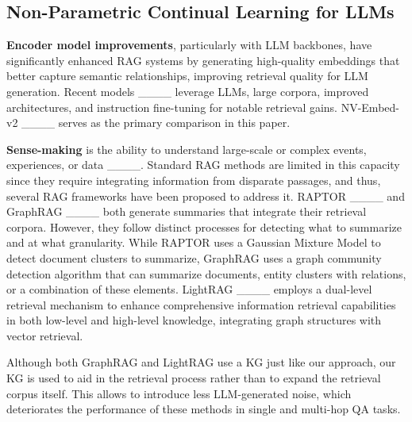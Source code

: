 \subsection{Non-Parametric Continual Learning for LLMs}

\textbf{Encoder model improvements}, particularly with LLM backbones, have significantly enhanced RAG systems by generating high-quality embeddings that better capture semantic relationships, improving retrieval quality for LLM generation. Recent models ____ leverage LLMs, large corpora, improved architectures, and instruction fine-tuning for notable retrieval gains. NV-Embed-v2 ____ serves as the primary comparison in this paper.

\noindent \textbf{Sense-making} is the ability to understand large-scale 
or complex events, experiences, or data ____. Standard RAG methods are limited in this capacity since they require integrating information from disparate passages, and thus, several RAG frameworks have been proposed to address it. RAPTOR ____ and GraphRAG ____ both generate summaries that integrate their retrieval corpora. However, they follow distinct processes for detecting what to summarize and at what granularity. While RAPTOR uses a Gaussian Mixture Model to detect document clusters to summarize, GraphRAG uses a graph community detection algorithm that can summarize documents, entity clusters with relations, or a combination of these elements.
LightRAG ____ employs a dual-level retrieval mechanism to enhance comprehensive information retrieval capabilities in both low-level and high-level knowledge, integrating graph structures with vector retrieval. 

Although both GraphRAG and LightRAG use a KG just like our \ours approach, our KG is used to aid in the retrieval process rather than to expand the retrieval corpus itself. This allows \ours to introduce less LLM-generated noise, which deteriorates the performance of these methods in single and multi-hop QA tasks.

